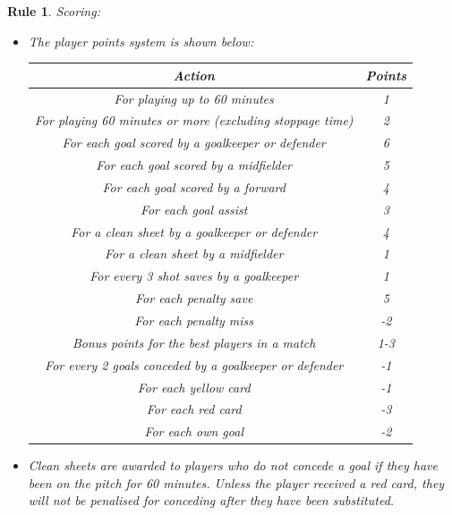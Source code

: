 \documentclass[12pt, a4paper, oneside]{book}
\newtheorem{rules}[theorem]{Rule}
\numberwithin{equation}{section}
\begin{document}
\begin{rules} \label{scoring rules}
  Scoring:
  \begin{itemize}
    \item The player points system is shown below:
      \begin{center}
        \begin{tabular}{ |c|c| }
          \hline
          Action & Points \\ [0.5ex] 
          \hline\hline
          For playing up to 60 minutes & 1 \\
          \hline
          For playing 60 minutes or more (excluding stoppage time) & 2 \\
          \hline
          For each goal scored by a goalkeeper or defender & 6 \\
          \hline
          For each goal scored by a midfielder & 5 \\
          \hline
          For each goal scored by a forward & 4 \\
          \hline
          For each goal assist & 3 \\
          \hline
          For a clean sheet by a goalkeeper or defender & 4 \\
          \hline
          For a clean sheet by a midfielder & 1 \\
          \hline
          For every 3 shot saves by a goalkeeper & 1 \\
          \hline
          For each penalty save & 5 \\
          \hline
          For each penalty miss & -2 \\
          \hline
          Bonus points for the best players in a match & 1-3 \\
          \hline
          For every 2 goals conceded by a goalkeeper or defender & -1 \\
          \hline
          For each yellow card & -1 \\
          \hline
          For each red card & -3 \\
          \hline
          For each own goal & -2 \\
          \hline
        \end{tabular}
      \end{center}
    \item Clean sheets are awarded to players who do not concede a goal if they have been on the pitch for 60 minutes. Unless the player received a red card, they will not be penalised for conceding after they have been substituted.

\end{itemize}
\end{rules}
\end{document}
